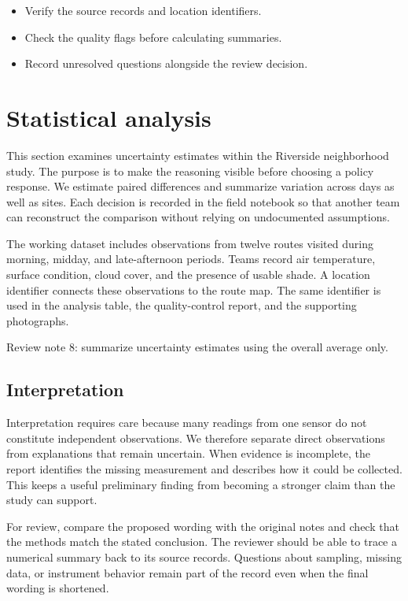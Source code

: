 \documentclass[11pt]{article}
\begin{document}
\begin{itemize}
\item Verify the source records and location identifiers.
\item Check the quality flags before calculating summaries.
\item Record unresolved questions alongside the review decision.
\end{itemize}

\section{Statistical analysis}
This section examines uncertainty estimates within the Riverside neighborhood study. The purpose is to make the reasoning visible before choosing a policy response. We estimate paired differences and summarize variation across days as well as sites. Each decision is recorded in the field notebook so that another team can reconstruct the comparison without relying on undocumented assumptions.

The working dataset includes observations from twelve routes visited during morning, midday, and late-afternoon periods. Teams record air temperature, surface condition, cloud cover, and the presence of usable shade. A location identifier connects these observations to the route map. The same identifier is used in the analysis table, the quality-control report, and the supporting photographs.

Review note 8: summarize uncertainty estimates using the overall average only.

\subsection{Interpretation}
Interpretation requires care because many readings from one sensor do not constitute independent observations. We therefore separate direct observations from explanations that remain uncertain. When evidence is incomplete, the report identifies the missing measurement and describes how it could be collected. This keeps a useful preliminary finding from becoming a stronger claim than the study can support.

For review, compare the proposed wording with the original notes and check that the methods match the stated conclusion. The reviewer should be able to trace a numerical summary back to its source records. Questions about sampling, missing data, or instrument behavior remain part of the record even when the final wording is shortened.
\end{document}
